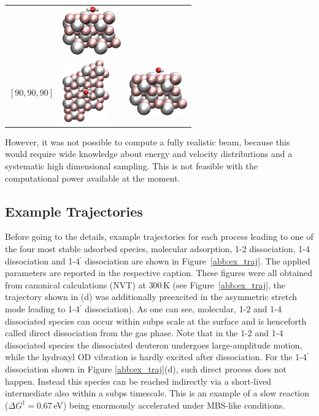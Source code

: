 \documentclass[11pt,DIV=13,BCOR=5mm,a4paper,headinclude]{scrbook}
\begin{document}
\begin{table}[!h]
\begin{tabular}{cp{4cm}p{4cm}}
& \includegraphics[width=2.5cm]{figures/0001/Ausrichtungsbilder/90_90_0-sidetest.png}\\
$[90, 90, 90]$ & \includegraphics[width=2cm,angle=90]{figures/0001/Ausrichtungsbilder/90_90_90-toptest.png} 
& \includegraphics[width=2.5cm]{figures/0001/Ausrichtungsbilder/90_90_90-sidetest.png}\\\bottomrule
\end{tabular}
 \label{tab:orientations}
\end{table}
However, it was not possible to compute a fully realistic beam, because this would require wide knowledge about energy and velocity distributions and a systematic high dimensional sampling.
This is not feasible with the computational power available at the moment.
\clearpage
\subsection{Example Trajectories}
Before going to the details, example trajectories for each process leading to one of the four most stable adsorbed species, molecular adsorption, 1-2 dissociation, 1-4 dissociation and 1-4$^\prime$ dissociation are shown in Figure~\ref{abb:ex_traj}.
The applied parameters are reported in the respective caption.
These figures were all obtained from canonical calculations (NVT) at $300\,$K (see Figure~\ref{abb:ex_traj}, the trajectory shown in (d) was additionally preexcited in the asymmetric stretch mode leading to 1-4$^\prime$ dissociation).
As one can see, molecular, 1-2 and 1-4 dissociated species can occur within subps scale at the surface and is henceforth called direct dissociation from the gas phase.
Note that in the 1-2 and 1-4 dissociated species the dissociated deuteron undergoes large-amplitude motion, while the hydroxyl OD vibration is hardly excited after dissociation.
For the 1-4$^\prime$ dissociation shown in Figure \ref{abb:ex_traj}(d), such direct process does not happen.
Instead this species can be reached indirectly via a short-lived intermediate also within a subps timescale. %
This is an example of a slow reaction ($\Delta G^\ddagger=0.67\,$eV) being enormously accelerated under MBS-like conditions.
\end{document}
